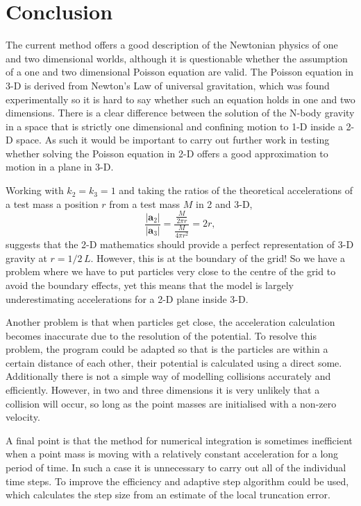 \documentclass[10pt,a4paper]{article}
\begin{document}
\section{Conclusion}
The current method offers a good description of the Newtonian physics of one and two dimensional worlds, although it is questionable whether the assumption of a one and two dimensional Poisson equation are valid. The Poisson equation in 3-D is derived from Newton's Law of universal gravitation, which was found experimentally so it is hard to say whether such an equation holds in one and two dimensions. There is a clear difference between the solution of the N-body gravity in a space that is strictly one dimensional and confining motion to 1-D inside a 2-D space. As such it would be important to carry out further work in testing whether solving the Poisson equation in 2-D offers a good approximation to motion in a plane in 3-D. 

Working with $k_2=k_3=1$ and taking the ratios of the theoretical accelerations of a test mass a position $r$ from a test mass $M$ in 2 and 3-D,
\begin{equation}
\frac{|\textbf{a}_2|}{|\textbf{a}_3|} = \frac{\frac{M}{2\pi r}}{\frac{M}{4\pi r^2}} = 2r,
\end{equation}
suggests that the 2-D mathematics should provide a perfect representation of 3-D gravity at $r=1/2\, L$. However, this is at the boundary of the grid! So we have a problem where we have to put particles very close to the centre of the grid to avoid the boundary effects, yet this means that the model is largely underestimating accelerations for a 2-D plane inside 3-D.

Another problem is that when particles get close, the acceleration calculation becomes inaccurate due to the resolution of the potential. To resolve this problem, the program could be adapted so that is the particles are within a certain distance of each other, their potential is calculated using a direct some. Additionally there is not a simple way of modelling collisions accurately and efficiently. However, in two and three dimensions it is very unlikely that a collision will occur, so long as the point masses are initialised with a non-zero velocity.

A final point is that the method for numerical integration is sometimes inefficient when a point mass is moving with a relatively constant acceleration for a long period of time. In such a case it is unnecessary to carry out all of the individual time steps. To improve the efficiency and adaptive step algorithm could be used, which calculates the step size from an estimate of the local truncation error.
\end{document}
